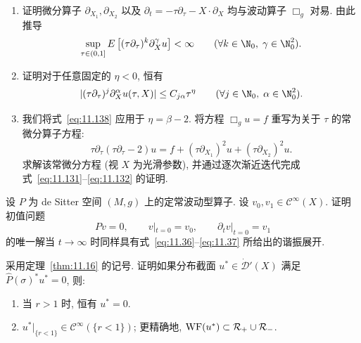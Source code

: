 \begin{exer}[标量波动算子的谐振]
\begin{enumerate}[label=(\arabic*)]
    \item 证明微分算子 $\partial_{X_1}, \partial_{X_2}$ 以及 $\partial_t = -\tau \partial_\tau - X \cdot \partial_X$ 均与波动算子 $\Box_g$ 对易. 由此推导
    \begin{equation}\label{eq:11.137}
        \sup_{\tau \in (0, 1]} E\left[ (\tau \partial_\tau)^k \partial_X^\gamma u \right] < \infty \qquad (\forall k \in \N_0, \; \gamma \in \N_0^2).
    \end{equation}
    \item 证明对于任意固定的 $\eta < 0$, 恒有
    \begin{equation}\label{eq:11.138}
        |(\tau \partial_\tau)^j \partial_X^\alpha u(\tau, X)| \le C_{j\alpha} \tau^\eta \qquad (\forall j \in \N_0, \; \alpha \in \N_0^2).
    \end{equation}
    \item 我们将式~\eqref{eq:11.138} 应用于 $\eta = \beta - 2$. 将方程 $\Box_g u = f$ 重写为关于 $\tau$ 的常微分算子方程:
    \begin{equation}\label{eq:11.139}
        \tau \partial_\tau(\tau \partial_\tau - 2) u = f + (\tau \partial_{X_1})^2 u + (\tau \partial_{X_2})^2 u.
    \end{equation}
    求解该常微分方程 (视 $X$ 为光滑参数), 并通过逐次渐近迭代完成式~\eqref{eq:11.131}--\eqref{eq:11.132} 的证明.
\end{enumerate}
\end{exer}

\begin{exer}[初值问题]\label{ex:11.2}
设 $P$ 为 de Sitter 空间 $(M, g)$ 上的定常波动型算子. 设 $v_0, v_1 \in \mathcal{C}^\infty(X)$. 证明初值问题
\[
    P v = 0, \qquad v|_{t=0} = v_0, \qquad \partial_t v|_{t=0} = v_1
\]
的唯一解当 $t \to \infty$ 时同样具有式~\eqref{eq:11.36}--\eqref{eq:11.37} 所给出的谐振展开.
\end{exer}

\begin{exer}[对偶谐振态的正则性]\label{ex:11.3}
采用定理~\ref{thm:11.16} 的记号. 证明如果分布截面 $u^* \in \dot{\mathscr{D}}'(X)$ 满足 $\widehat{P}(\sigma)^* u^* = 0$, 则:
\begin{enumerate}[label=(\arabic*)]
    \item 当 $r > 1$ 时, 恒有 $u^* = 0$.
    \item $u^*|_{\{r < 1\}} \in \mathcal{C}^\infty(\{r < 1\})$; 更精确地, $\operatorname{WF}(u^*) \subset \mathcal{R}_+ \cup \mathcal{R}_-$.
\end{enumerate}
\end{exer}

